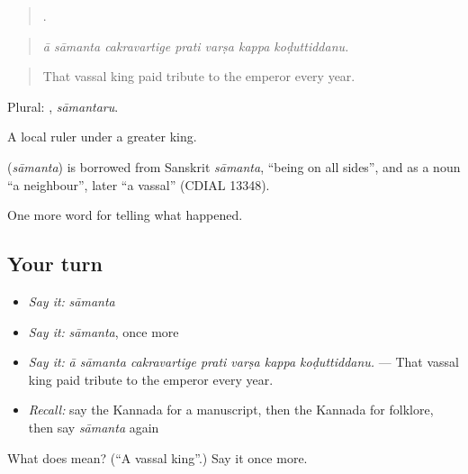 \begin{quote}
      .
\end{quote}

\begin{quote}
\emph{ā sāmanta cakravartige prati varṣa kappa koḍuttiddanu.}
\end{quote}

\begin{quote}
That vassal king paid tribute to the emperor every year.
\end{quote}

Plural: , \emph{sāmantaru}.

A local ruler under a greater king.

\begin{cousinweb}
\textbf{} (\emph{sāmanta}) is borrowed from Sanskrit \emph{sāmanta}, \textquotedblleft{}being on all sides\textquotedblright{}, and as a noun \textquotedblleft{}a neighbour\textquotedblright{}, later \textquotedblleft{}a vassal\textquotedblright{} (CDIAL 13348).
\end{cousinweb}

\begin{grammarlens}[title={What you've built}]
One more word for telling what happened.
\end{grammarlens}

\subsection*{Your turn}
\begin{itemize}
\raggedright
  \item \emph{Say it:} \emph{sāmanta}
  \item \emph{Say it:} \emph{sāmanta}, once more
  \item \emph{Say it:} \emph{ā sāmanta cakravartige prati varṣa kappa koḍuttiddanu.} — That vassal king paid tribute to the emperor every year.
  \item \emph{Recall:} say the Kannada for a manuscript, then the Kannada for folklore, then say \emph{sāmanta} again
\end{itemize}

\begin{tcolorbox}[breakable,colback=teal!4,colframe=teal!35!black,title={Before you move on}]
What does  mean? (\textquotedblleft{}A vassal king\textquotedblright{}.) Say it once more.
\end{tcolorbox}
